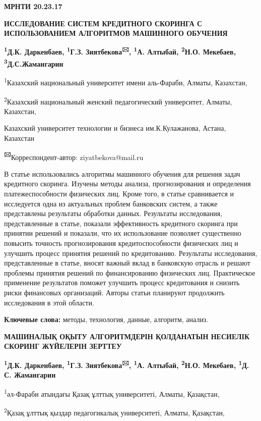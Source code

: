 {\bfseries МРНТИ 20.23.17}

{\bfseries ИССЛЕДОВАНИЕ СИСТЕМ КРЕДИТНОГО СКОРИНГА С ИСПОЛЬЗОВАНИЕМ
АЛГОРИТМОВ МАШИННОГО ОБУЧЕНИЯ}

{\bfseries \textsuperscript{1}Д.К. Даркенбаев, \textsuperscript{1}Г.З.
Зиятбекова\textsuperscript{🖂}, \textsuperscript{1}А. Алтыбай,
\textsuperscript{2}Н.О. Мекебаев, \textsuperscript{3}Д.С.Жамангарин}

\textsuperscript{1}Казахский национальный университет имени аль-Фараби,
Алматы, Казахстан,

\textsuperscript{2}Казахский национальный женский педагогический
университет, Алматы, Казахстан,

Казахский университет технологии и бизнеса им.К.Кулажанова, Астана,
Казахстан

{\bfseries \textsuperscript{🖂}}Корреспондент-автор: ziyatbekova@mail.ru

В статье использовались алгоритмы машинного обучения для решения задач
кредитного скоринга. Изучены методы анализа, прогнозирования и
определения платежеспособности физических лиц. Кроме того, в статье
сравнивается и исследуется одна из актуальных проблем банковских систем,
а также представлены результаты обработки данных. Результаты
исследования, представленные в статье, показали эффективность кредитного
скоринга при принятии решений и показали, что их использование позволяет
существенно повысить точность прогнозирования кредитоспособности
физических лиц и улучшить процесс принятия решений по кредитованию.
Результаты исследования, представленные в статье, вносят важный вклад в
банковскую отрасль и решают проблемы принятия решений по финансированию
физических лиц. Практическое применение результатов поможет улучшить
процесс кредитования и снизить риски финансовых организаций. Авторы
статьи планируют продолжить исследования в этой области.

{\bfseries Ключевые слова:} методы, технология, данные, алгоритм, анализ.

{\bfseries МАШИНАЛЫҚ ОҚЫТУ АЛГОРИТМДЕРІН ҚОЛДАНАТЫН НЕСИЕЛІК СКОРИНГ
ЖҮЙЕЛЕРІН ЗЕРТТЕУ}

{\bfseries \textsuperscript{1}Д.К. Даркенбаев, \textsuperscript{1}Г.З.
Зиятбекова\textsuperscript{🖂}, \textsuperscript{1}А. Алтыбай,
\textsuperscript{2}Н.О. Мекебаев, \textsuperscript{1}Д. С. Жамангарин}

\textsuperscript{1}әл-Фараби атындағы Қазақ ұлттық университеті, Алматы,
Қазақстан,

\textsuperscript{2}Қазақ ұлттық қыздар педагогикалық университеті,
Алматы, Қазақстан,

